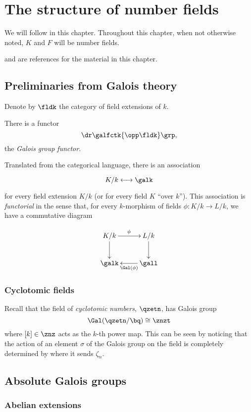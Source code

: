 \chapter{The structure of number fields}

We will follow \cite{frenkel} in this chapter. Throughout this chapter, when not
otherwise noted, $K$ and $F$ will be number fields.

\cite{kks1} and \cite{kks2} are references for the material in this chapter.

\section{Preliminaries from Galois theory}
Denote by $\fldk$ the category of field extensions of $k$.

\begin{thm}
  There is a functor
  \[\dr \galfctk {\opp\fldk} \grp,\]
  the \textit{Galois group functor}.
\end{thm}

Translated from the categorical language, there is an association

\[ K/k \longleftrightarrow \galk \]

for every field extension $K/k$ (or for every field $K$ ``over $k$''). This
association is \textit{functorial} in the sense that, for every $k$-morphism of
fields $\phi: K/k \to L/k$, we have a commutative diagram

\[
  \xymatrix{
    K/k   \ar[d] \ar[r]^\phi &L/k \ar[d]\\
    \galk &\gall \ar[l]^{\Gal(\phi)}   }
\]

\subsection{Cyclotomic fields}

Recall that the field of \textit{cyclotomic numbers}, $\qzetn$, has Galois
group
\[\Gal(\qzetn/\bq) \cong \znzt \]
where $[k]\in\znz$ acts as the $k$-th power map. This can be seen by noticing
that the action of an element $\sigma$ of the Galois group on the field is completely
determined by where it sends $\zeta_n$.

\section{Absolute Galois groups}

\subsection{Abelian extensions}

